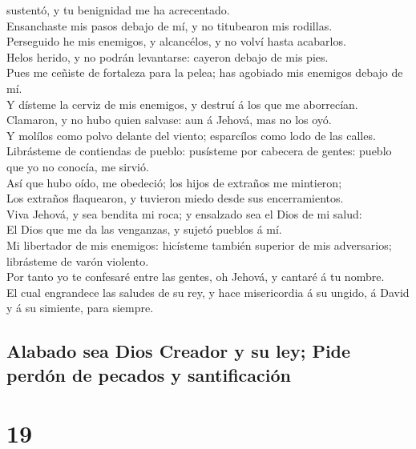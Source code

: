 sustentó, y tu benignidad me ha acrecentado.\\
 Ensanchaste mis pasos debajo de mí, y no titubearon mis
rodillas.\\
 Perseguido he mis enemigos, y alcancélos, y no volví hasta
acabarlos.\\
 Helos herido, y no podrán levantarse: cayeron debajo de
mis pies.\\
 Pues me ceñiste de fortaleza para la pelea; has agobiado
mis enemigos debajo de mí.\\
 Y dísteme la cerviz de mis enemigos, y destruí á los que
me aborrecían.\\
 Clamaron, y no hubo quien salvase: aun á Jehová, mas no
los oyó.\\
 Y molílos como polvo delante del viento; esparcílos como
lodo de las calles.\\
 Librásteme de contiendas de pueblo: pusísteme por cabecera
de gentes: pueblo que yo no conocía, me sirvió.\\
 Así que hubo oído, me obedeció; los hijos de extraños me
mintieron;\\
 Los extraños flaquearon, y tuvieron miedo desde sus
encerramientos.\\
 Viva Jehová, y sea bendita mi roca; y ensalzado sea el
Dios de mi salud:\\
 El Dios que me da las venganzas, y sujetó pueblos á mí.\\
 Mi libertador de mis enemigos: hicísteme también superior
de mis adversarios; librásteme de varón violento.\\
 Por tanto yo te confesaré entre las gentes, oh Jehová, y
cantaré á tu nombre.\\
 El cual engrandece las saludes de su rey, y hace
misericordia á su ungido, á David y á su simiente, para siempre.

\hypertarget{alabado-sea-dios-creador-y-su-ley-pide-perduxf3n-de-pecados-y-santificaciuxf3n}{%
\subsection{Alabado sea Dios Creador y su ley; Pide perdón de pecados y
santificación}\label{alabado-sea-dios-creador-y-su-ley-pide-perduxf3n-de-pecados-y-santificaciuxf3n}}

\hypertarget{section-18}{%
\section{19}\label{section-18}}

